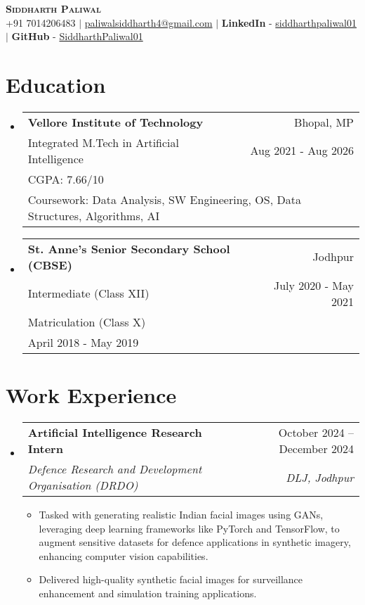 \documentclass[letterpaper,11pt]{article}
\makeatletter
\newcommand{\resumeItem}[1]{
  \item\small{
    {#1 \vspace{-2pt}}
  }
}
\newcommand{\resumeSubheading}[4]{
  \vspace{-2pt}\item
    \begin{tabular*}{0.97\textwidth}[t]{l@{\extracolsep{\fill}}r}
      \textbf{#1} & #2 \\
      \textit{\small#3} & \textit{\small #4} \\
    \end{tabular*}\vspace{-7pt}
}
\newcommand{\educationEntry}[6]{
  \vspace{-2pt}\item
    \begin{tabular*}{0.97\textwidth}[t]{l@{\extracolsep{\fill}}r}
      \textbf{#1} & \small{#2} \\
      \small{#3} & \small{#4} \\
      \multicolumn{2}{l}{\small{#5}} \\
      \multicolumn{2}{l}{\small{#6}} \\
    \end{tabular*}\vspace{-7pt}
}
\newcommand{\resumeSubHeadingListStart}{\begin{itemize}[leftmargin=0.15in, label={}]}
\newcommand{\resumeSubHeadingListEnd}{\end{itemize}}
\newcommand{\resumeItemListStart}{\begin{itemize}}
\newcommand{\resumeItemListEnd}{\end{itemize}\vspace{-5pt}}
\makeatother
\begin{document}
\begin{center}
    \textbf{\Huge \scshape Siddharth Paliwal} \\ \vspace{1pt}
    \small +91 7014206483 $|$ \href{mailto:paliwalsiddharth4@gmail.com}{paliwalsiddharth4@gmail.com} $|$ 
    \textbf{LinkedIn} - \href{https://www.linkedin.com/in/siddharthpaliwal01/}{siddharthpaliwal01} $|$
    \textbf{GitHub} - \href{https://github.com/SiddharthPaliwal01}{SiddharthPaliwal01}
\end{center}


\section{Education}
  \resumeSubHeadingListStart
    \educationEntry
      {Vellore Institute of Technology}
      {Bhopal, MP}
      {Integrated M.Tech in Artificial Intelligence}
      {Aug 2021 - Aug 2026}
      {CGPA: 7.66/10} 
      {Coursework: Data Analysis, SW Engineering, OS, Data Structures, Algorithms, AI}
      
    \educationEntry
      {St. Anne's Senior Secondary School (CBSE)}
      {Jodhpur}
      {Intermediate (Class XII)}
      {July 2020 - May 2021}
      {Matriculation (Class X)}
      {April 2018 - May 2019}
  \resumeSubHeadingListEnd

\section{Work Experience}
  \resumeSubHeadingListStart
    \resumeSubheading
      {Artificial Intelligence Research Intern}{October 2024 -- December 2024}
      {Defence Research and Development Organisation (DRDO)}{DLJ, Jodhpur}
      \resumeItemListStart
        \resumeItem{Tasked with generating realistic Indian facial images using GANs, leveraging deep learning frameworks like PyTorch and TensorFlow, to augment sensitive datasets for defence applications in synthetic imagery, enhancing computer vision capabilities.}
        \resumeItem{Delivered high-quality synthetic facial images for surveillance enhancement and simulation training applications.}
      \resumeItemListEnd
  \resumeSubHeadingListEnd

\end{document}
